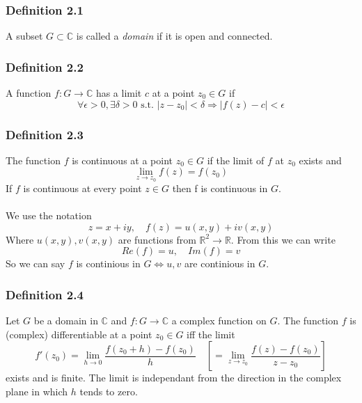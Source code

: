 \documentclass[a4paper, 12pt, twoside]{article}
\begin{document}
\subsubsection*{Definition 2.1}
A subset $G\subset \mathbb{C}$ is called a \emph{domain} if it is open and connected.
\subsubsection*{Definition 2.2}
A function $f:G \to  \mathbb{C}$ has a limit $c$ at a point $z_{0}\in G$ if
$$\forall\epsilon>0,\exists\delta>0\text{ s.t. } |z-z_{0}|<\delta \Rightarrow |f(z)-c|<\epsilon$$
\subsubsection*{Definition 2.3}
The function $f$ is continuous at a point $z_{0}\in G$ if the limit of $f$ at $z_{0}$ exists and
$$ \lim_{z\to z_{0}}f(z)=f(z_{0})$$
If $f$ is continuous at every point $z\in G$ then f is continuous in $G$.\\\\
We use the notation
$$z = x+iy,\quad f(z)=u(x,y)+iv(x,y) $$
Where $u(x,y),v(x,y)$ are functions from $\mathbb{R}^{2}\to \mathbb{R}$. From this we can write
$$ Re(f)=u,\quad Im(f)=v$$
So we can say $f$ is continious in $G \iff u,v$ are continious in $G$.
\subsubsection*{Definition 2.4}
Let $G$ be a domain in $\mathbb{C}$ and $f:G \to  \mathbb{C}$ a complex function on $G$. The function $f$ is (complex) differentiable at a point $z_{0}\in G$ iff the limit
$$ f'(z_{0})=\lim_{h\to0}\frac{f(z_{0}+h)-f(z_{0})}{h}\quad[= \lim_{z\to z_{0}}\frac{f(z)-f(z_{0})}{z-z_{0}}]$$
exists and is finite.
The limit is independant from the direction in the complex plane in which $h$ tends to zero.

\newepage
\end{document}
